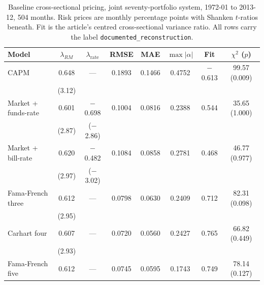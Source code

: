 \begin{table}[htbp]
\centering
\small
\caption{Baseline cross-sectional pricing, joint seventy-portfolio system,
1972-01 to 2013-12, 504 months. Risk prices are monthly percentage points with %
Shanken $t$-ratios beneath. Fit is the article's centred cross-sectional variance
ratio. All rows carry the label \texttt{documented\_reconstruction}.}
\label{tab:baseline}
\begin{tabular}{lccccccc}
\toprule
Model & $\lambda_{RM}$ & $\lambda_{\text{rate}}$ & RMSE & MAE & $\max|\alpha|$ & Fit & $\chi^2$ ($p$) \\ %
\midrule
CAPM & 0.648 & --- & 0.1893 & 0.1466 & 0.4752 & $-$0.613 & 99.57 (0.009) \\ %
 & (3.12) &  & & & & & \\ %
Market + funds-rate & 0.601 & $-$0.698 & 0.1004 & 0.0816 & 0.2388 & 0.544 & 35.65 (1.000) \\ %
 & (2.87) & ($-$2.86) & & & & & \\ %
Market + bill-rate & 0.620 & $-$0.482 & 0.1084 & 0.0858 & 0.2781 & 0.468 & 46.77 (0.977) \\ %
 & (2.97) & ($-$3.02) & & & & & \\ %
\midrule
Fama-French three & 0.612 & --- & 0.0798 & 0.0630 & 0.2409 & 0.712 & 82.31 (0.098) \\ %
 & (2.95) &  & & & & & \\ %
Carhart four & 0.607 & --- & 0.0720 & 0.0560 & 0.2427 & 0.765 & 66.82 (0.449) \\ %
 & (2.93) &  & & & & & \\ %
Fama-French five & 0.612 & --- & 0.0745 & 0.0595 & 0.1743 & 0.749 & 78.14 (0.127) \\ %

\end{tabular}
\end{table}
